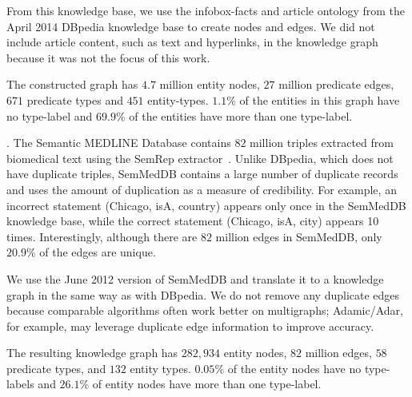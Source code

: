 \documentclass[reprint,twocolumn,showpacs,preprintnumbers,amsmath, aps,pre,amssymb]{revtex4-1}
\begin{document}
From this knowledge base, we use the infobox-facts and article ontology from the April 2014 DBpedia knowledge base to create nodes and edges. We did not include article content, such as text and hyperlinks, in the knowledge graph because it was not the focus of this work.

The constructed graph has $4.7$ million entity nodes, $27$ million predicate edges, $671$ predicate types and $451$ entity-types. $1.1\%$ of the entities in this graph have no type-label and $69.9\%$ of the entities have more than one type-label.

\vspace{5pt}. The Semantic MEDLINE Database contains $82$ million triples extracted from biomedical text using the SemRep extractor~\cite{Rindflesch2003}. Unlike DBpedia, which does not have duplicate triples, SemMedDB contains a large number of duplicate records and uses the amount of duplication as a measure of credibility. For example, an incorrect statement (\textsf{Chicago}, \textsf{isA}, \textsf{country}) appears only once in the SemMedDB knowledge base, while the correct statement (\textsf{Chicago}, \textsf{isA}, \textsf{city}) appears 10 times. Interestingly, although there are $82$ million edges in SemMedDB, only $20.9\%$ of the edges are unique.

We use the June 2012 version of SemMedDB and translate it to a knowledge graph in the same way as with DBpedia. We do not remove any duplicate edges because comparable algorithms often work better on multigraphs; Adamic/Adar, for example, may leverage duplicate edge information to improve accuracy. 

The resulting knowledge graph has $282,934$ entity nodes, $82$ million edges, $58$ predicate types, and $132$ entity types. $0.05\%$ of the entity nodes have no type-labels and $26.1\%$ of entity nodes have more than one type-label.

\begin{table}[t]
    \centering
    \caption{Statistics of knowledge graph datasets.}
    \label{tab:stat}
\end{table}
\end{document}
